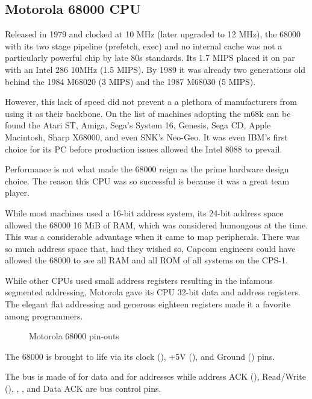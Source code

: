 \subsection{Motorola 68000 CPU}

 Released in 1979 and clocked at 10 MHz (later upgraded to 12 MHz), the 68000 with its two stage pipeline\cite{M68000fv} (prefetch, exec) and no internal cache was not a particularly powerful chip by late 80s standards. Its 1.7 MIPS placed it on par with an Intel 286 10MHz (1.5 MIPS). By 1989 it was already two generations old behind the 1984 M68020 (3 MIPS) and the 1987 M68030 (5 MIPS)\cite{mips}.


However, this lack of speed did not prevent a a plethora of manufacturers from using it as their backbone. On the list of machines adopting the m68k can be found the Atari ST, Amiga, Sega's System 16, Genesis, Sega CD, Apple Macintosh, Sharp X68000, and even SNK's Neo-Geo. It was even IBM's first choice for its PC before production issues allowed the Intel 8088 to prevail\cite{ieee20170630}. 

Performance is not what made the 68000 reign as the prime hardware design choice. The reason this CPU was so successful is because it was a great team player.

While most machines used a 16-bit address system, its 24-bit address space allowed the 68000 16 MiB of RAM, which was considered humongous at the time. This was a considerable advantage when it came to map peripherals. There was so much address space that, had they wished so, Capcom engineers could have allowed the 68000 to see all RAM and all ROM of all systems on the CPS-1.

While other CPUs used small address registers resulting in the infamous segmented addressing, Motorola gave its CPU 32-bit data and address registers. The elegant flat addressing and generous eighteen registers made it a favorite among programmers. 


\begin{figure}[H]

 
 \caption*{Motorola 68000 pin-outs}
\label{68000drawing}
  \end{figure}



The 68000 is brought to life via its clock (), +5V (), and Ground () pins.

The bus is made of  for data and \icode{A0-A15]} for addresses while address ACK (), Read/Write (), , , and Data ACK  are bus control pins.


